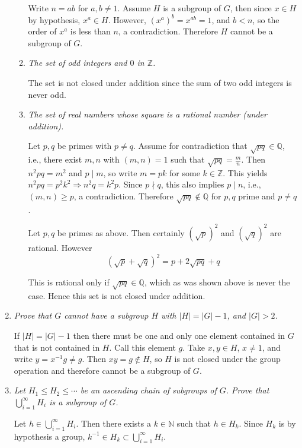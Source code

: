 \documentclass[letterpaper, 11pt]{article}
\begin{document}
\begin{enumerate}
\begin{enumerate}
Write $n=ab$ for $a,b \neq 1$.  Assume $H$ is a subgroup of $G$, then since $x \in H$ by hypothesis, $x^a \in H$.  However, $(x^a)^b = x^{ab} = 1$, and $b < n$, so the order of $x^a$ is less than $n$, a contradiction.  Therefore $H$ cannot be a subgroup of $G$.

\item \emph{The set of odd integers and $0$ in $\mathbb{Z}$.}

The set is not closed under addition since the sum of two odd integers is never odd.

\item \emph{The set of real numbers whose square is a rational number (under addition).}

Let $p,q$ be primes with $p \neq q$.  Assume for contradiction that $\sqrt{pq} \in \mathbb{Q}$, i.e., there exist $m,n$ with $(m,n) = 1$ such that $\sqrt{pq} = \frac{m}{n}$.  Then $n^2pq = m^2$ and $p \mid m$, so write $m = pk$ for some $k \in \mathbb{Z}$.  This yields $n^2pq = p^2k^2 \Rightarrow n^2q = k^2p$.  Since $p \nmid q$, this also implies $p \mid n$, i.e., $(m,n) \geq p$, a contradiction.  Therefore $\sqrt{pq} \notin \mathbb{Q}$ for $p,q$ prime and $p \neq q$.

Let $p,q$ be primes as above.  Then certainly $\left(\sqrt{p}\right)^2$ and $\left(\sqrt{q}\right)^2$ are rational.  However
\[
(\sqrt{p}+\sqrt{q})^2 = p + 2\sqrt{pq} + q
\]

This is rational only if $\sqrt{pq} \in \mathbb{Q}$, which as was shown above is never the case.  Hence this set is not closed under addition.

\end{enumerate}

\item \emph{Prove that $G$ cannot have a subgroup $H$ with $|H| = |G|-1$, and $|G| > 2$.}

If $|H| = |G| - 1$ then there must be one and only one element contained in $G$ that is not contained in $H$.  Call this element $g$.  Take $x,y \in H$, $x \neq 1$, and write $y = x^{-1}g \neq g$.  Then $xy = g \notin H$, so $H$ is not closed under the group operation and therefore cannot be a subgroup of $G$.

\item \emph{Let $H_1 \leq H_2 \leq \cdots$ be an ascending chain of subgroups of $G$.  Prove that $\bigcup_{i=1}^\infty H_i$ is a subgroup of $G$.}

Let $h \in \bigcup_{i=1}^\infty H_i$. Then there exists a $k \in \mathbb{N}$ such that $h \in H_k$.  Since $H_k$ is by hypothesis a group, $k^{-1} \in H_k \subset \bigcup_{i=1}^\infty H_i$.


\end{enumerate}
\end{document}
